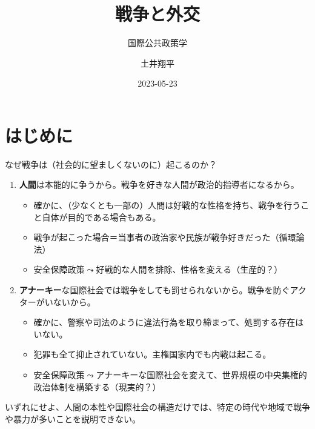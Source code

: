 \documentclass[
  xelatex,
  ja=standard]{bxjsarticle}
\title{戦争と外交}
\subtitle{国際公共政策学}
\author{土井翔平}
\date{2023-05-23}
\providecommand{\tightlist}{%
  \setlength{\itemsep}{0pt}\setlength{\parskip}{0pt}}\usepackage{longtable,booktabs,array}
\begin{document}
\maketitle
\ifdefined\Shaded\renewenvironment{Shaded}{\begin{tcolorbox}[interior hidden, sharp corners, borderline west={3pt}{0pt}{shadecolor}, enhanced, breakable, frame hidden, boxrule=0pt]}{\end{tcolorbox}}\fi

\hypertarget{ux306fux3058ux3081ux306b}{%
\section*{はじめに}\label{ux306fux3058ux3081ux306b}}

なぜ戦争は（社会的に望ましくないのに）起こるのか？

\begin{enumerate}
\def\labelenumi{\arabic{enumi}.}
\tightlist
\item
  \textbf{⼈間}は本能的に争うから。戦争を好きな⼈間が政治的指導者になるから。

  \begin{itemize}
  \tightlist
  \item
    確かに、（少なくとも一部の）人間は好戦的な性格を持ち、戦争を行うこと自体が目的である場合もある。
  \item
    戦争が起こった場合＝当事者の政治家や⺠族が戦争好きだった（循環論法）
  \item
    安全保障政策\(\leadsto\)好戦的な人間を排除、性格を変える（生産的？）
  \end{itemize}
\item
  \textbf{アナーキー}な国際社会では戦争をしても罰せられないから。戦争を防ぐアクターがいないから。

  \begin{itemize}
  \tightlist
  \item
    確かに、警察や司法のように違法行為を取り締まって、処罰する存在はいない。
  \item
    犯罪も全て抑止されていない。主権国家内でも内戦は起こる。
  \item
    安全保障政策\(\leadsto\)アナーキーな国際社会を変えて、世界規模の中央集権的政治体制を構築する（現実的？）
  \end{itemize}
\end{enumerate}

いずれにせよ、人間の本性や国際社会の構造だけでは、特定の時代や地域で戦争や暴力が多いことを説明できない。
\end{document}
